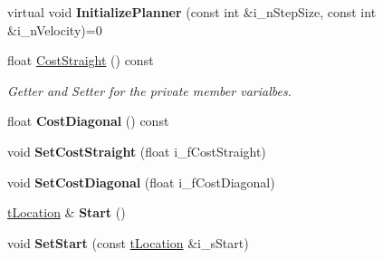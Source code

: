 \begin{DoxyCompactItemize}
\item 
\mbox{\label{classplanner_1_1c_rover_interface_a12ec1e02cc5eac9d5e8fea1bb835e0c0}} 
virtual void {\bfseries Initialize\+Planner} (const int \&i\+\_\+n\+Step\+Size, const int \&i\+\_\+n\+Velocity)=0
\item 
\mbox{\label{classplanner_1_1c_rover_interface_aa77e98811dbe34b474da519c0efa6a04}} 
float \mbox{\hyperlink{classplanner_1_1c_rover_interface_aa77e98811dbe34b474da519c0efa6a04}{Cost\+Straight}} () const
\begin{DoxyCompactList}\small\item\em Getter and Setter for the private member varialbes. \end{DoxyCompactList}\item 
\mbox{\label{classplanner_1_1c_rover_interface_a4227b0aaf49ae8f0e0968558981e577e}} 
float {\bfseries Cost\+Diagonal} () const
\item 
\mbox{\label{classplanner_1_1c_rover_interface_ad8a5f2c1fe9034b7a0049a1e8489b43a}} 
void {\bfseries Set\+Cost\+Straight} (float i\+\_\+f\+Cost\+Straight)
\item 
\mbox{\label{classplanner_1_1c_rover_interface_ac0df1c2cd4eebab29ca44255375e0fb4}} 
void {\bfseries Set\+Cost\+Diagonal} (float i\+\_\+f\+Cost\+Diagonal)
\item 
\mbox{\label{classplanner_1_1c_rover_interface_ad62c6dcbe7c8194c6a93ca1fc29ee4b8}} 
\mbox{\hyperlink{structplanner_1_1t_location}{t\+Location}} \& {\bfseries Start} ()
\item 
\mbox{\label{classplanner_1_1c_rover_interface_a29669ceb2b1f4cebf0953b59e3c8936a}} 
void {\bfseries Set\+Start} (const \mbox{\hyperlink{structplanner_1_1t_location}{t\+Location}} \&i\+\_\+s\+Start)
\item 
\mbox{\label{classplanner_1_1c_rover_interface_a5a02ffb5e04d128bf81567da55807850}} 

\end{DoxyCompactItemize}
